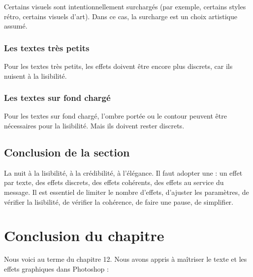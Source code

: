Certains visuels sont intentionnellement surchargés (par exemple, certains styles rétro, certains visuels d'art). Dans ce cas, la surcharge est un choix artistique assumé.

\subsubsection{Les textes très petits}

Pour les textes très petits, les effets doivent être encore plus discrets, car ils nuisent à la lisibilité.

\subsubsection{Les textes sur fond chargé}

Pour les textes sur fond chargé, l'ombre portée ou le contour peuvent être nécessaires pour la lisibilité. Mais ils doivent rester discrets.

\subsection*{Conclusion de la section}

La  nuit à la lisibilité, à la crédibilité, à l'élégance. Il faut adopter une  : un effet par texte, des effets discrets, des effets cohérents, des effets au service du message. Il est essentiel de limiter le nombre d'effets, d'ajuster les paramètres, de vérifier la lisibilité, de vérifier la cohérence, de faire une pause, de simplifier.

\section*{Conclusion du chapitre}

Nous voici au terme du chapitre 12. Nous avons appris à maîtriser le texte et les effets graphiques dans Photoshop :

